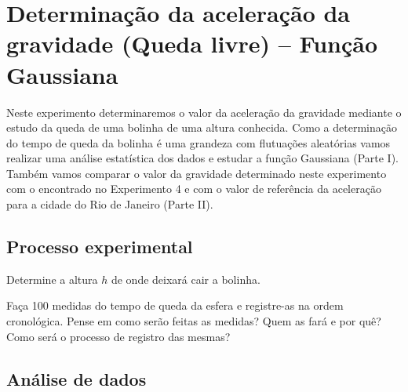 \chapter{Determinação da aceleração da gravidade (Queda livre) – Função Gaussiana}

\vspace{-0.7cm}

Neste experimento determinaremos o valor da aceleração da gravidade mediante o estudo da queda de uma bolinha de uma altura conhecida.  Como a determinação do tempo de queda da bolinha é uma grandeza com flutuações aleatórias vamos realizar uma análise estatística dos dados e estudar a função Gaussiana (Parte I).  Também vamos comparar o valor da gravidade determinado neste experimento com o encontrado no Experimento 4 e com o valor de referência da aceleração para a cidade do Rio de Janeiro (Parte II).

\section*{Processo experimental}
\begin{num}
\item Determine a altura $h$ de onde deixará cair a bolinha.
\item Faça 100 medidas do tempo de queda da esfera e registre-as na ordem cronológica. Pense em como serão feitas as medidas? Quem as fará e por quê? Como será o processo de registro das mesmas?
\end{num}

\section*{Análise de dados}


